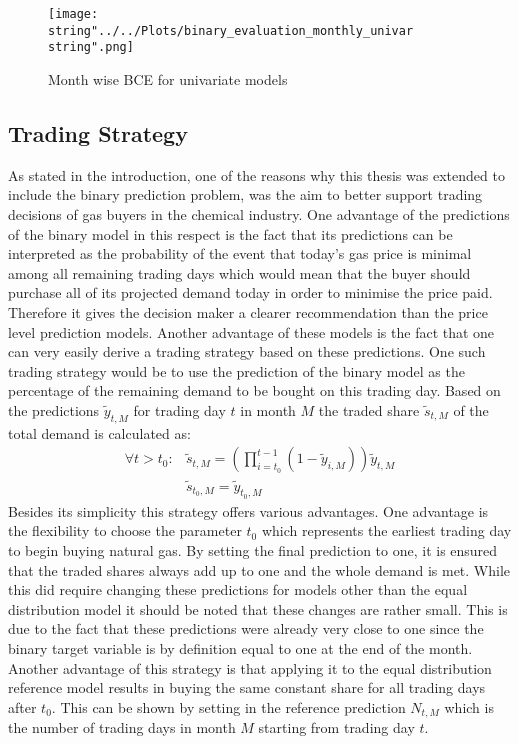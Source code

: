 \begin{figure}[h!]
  \centering
\texttt{[image: \\string"../../Plots/binary\_evaluation\_monthly\_univar\\string".png]}
  \caption{Month wise BCE for univariate models}\label{fig:binary_evaluation_monthly_univar}
\end{figure}

\subsection{Trading Strategy}
As stated in the introduction, one of the reasons why this thesis was extended to include the binary prediction problem, was the aim to better support trading decisions of gas buyers in the chemical industry. One advantage of the predictions of the binary model in this respect is the fact that its predictions can be interpreted as the probability of the event that today's gas price is minimal among all remaining trading days which would mean that the buyer should purchase all of its projected demand today in order to minimise the price paid. Therefore it gives the decision maker a clearer recommendation than the price level prediction models. Another advantage of these models is the fact that one can very easily derive a trading strategy based on these predictions.
One such trading strategy would be to use the prediction of the binary model as the percentage of the remaining demand to be bought on this trading day. Based on the predictions $\tilde{y}_{t,M}$ for 
trading day $t$ in month $M$ the traded share $\tilde{s}_{t,M}$ of the total demand is calculated as:
\begin{align*}
\forall t > t_0: &\tilde{s}_{t,M} = (\prod_{i = t_{0}}^{t-1}(1-\tilde{y}_{i,M}))\tilde{y}_{t,M}\\
&\tilde{s}_{t_0,M} = \tilde{y}_{t_0,M}
\end{align*}
Besides its simplicity this strategy offers various advantages. One advantage is the flexibility to choose the parameter $t_0$ which represents the earliest trading day to begin buying natural gas. By setting the final prediction to one, it is ensured that the traded shares always add up to one and the whole demand is met. While this did require changing these predictions for models other than the equal distribution model it should be noted that these changes are rather small. This is due to the fact that these predictions were already very close to one since the binary target variable is by definition equal to one at the end of the month. Another advantage of this strategy is that applying it to the equal distribution reference model results in buying the same constant share for all trading days after $t_0$. This can be shown by setting in the reference prediction $N_{t,M}$ which is the number of trading days in month $M$ starting from trading day $t$.

